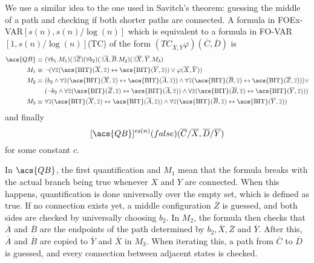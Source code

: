We use a similar idea to the one used in Savitch's theorem: guessing the middle of a path and checking if both shorter paths are connected.
A formula in \acs{FOEx-VAR}$[s(n), s(n)/\log(n)]$ which is equivalent to a formula in \acs{FO-VAR}$[1, s(n)/\log(n)]$(\acs{TC}) of the form $\left( TC_{\overline{X}, \overline{Y}}\varphi \right)(\overline{C}, \overline{D})$ is
\[
    \begin{aligned}
        \acs{QB} \equiv~& (\forall b_{1}.M_{1})(\exists\overline{Z}) (\forall b_{2})(\exists \overline{A}, \overline{B}.M_{2})(\exists\overline{X}, \overline{Y}.M_{3}) \\
        M_{1} \equiv~& \neg(\forall \overline{z} (\text{\acs{BIT}}(\overline{X}, \overline{z}) \leftrightarrow \text{\acs{BIT}}(\overline{Y}, \overline{z})) \lor \varphi(\overline{X}, \overline{Y})) \\
        M_{2} \equiv~&(b_{2} \land \forall \overline{z} (\text{\acs{BIT}}(\overline{X}, \overline{z}) \leftrightarrow \text{\acs{BIT}}(\overline{A}, \overline{z}))\land \forall \overline{z} (\text{\acs{BIT}}(\overline{B}, \overline{z}) \leftrightarrow \text{\acs{BIT}}(\overline{Z}, \overline{z}))) \lor \\
        &(\neg b_{2} \land \forall \overline{z} (\text{\acs{BIT}}(\overline{Z}, \overline{z}) \leftrightarrow \text{\acs{BIT}}(\overline{A}, \overline{z}))\land \forall \overline{z} (\text{\acs{BIT}}(\overline{B}, \overline{z}) \leftrightarrow \text{\acs{BIT}}(\overline{Y}, \overline{z}))) \\
        M_{3} \equiv~&\forall \overline{z} (\text{\acs{BIT}}(\overline{X}, \overline{z}) \leftrightarrow \text{\acs{BIT}}(\overline{A}, \overline{z}))\land \forall \overline{z} (\text{\acs{BIT}}(\overline{B}, \overline{z}) \leftrightarrow \text{\acs{BIT}}(\overline{Y}, \overline{z}))
    \end{aligned}
\]
and finally
\[
    [\acs{QB}]^{cs(n)}(false)(\overline{C} / \overline{X}, \overline{D} / \overline{Y})
\]
for some constant $c$.

In $\acs{QB}$, the first quantification and $M_1$ mean that the formula breaks with the actual branch being true whenever $X$ and $Y$ are connected.
When this happens, quantification is done universally over the empty set, which is defined as true.
If no connection exists yet, a middle configuration $\overline{Z}$ is guessed, and both sides are checked by universally choosing $b_2$.
In $M_2$, the formula then checks that $\overline{A}$ and $\overline{B}$ are the endpoints of the path determined by $b_2, \overline{X}, \overline{Z} \text{ and }\overline{Y}$.
After this, $\overline{A}$ and $\overline{B}$ are copied to $\overline{Y}$ and $\overline{X}$ in $M_3$.
When iterating this, a path from $\overline{C}$ to $\overline{D}$ is guessed, and every connection between adjacent states is checked.

